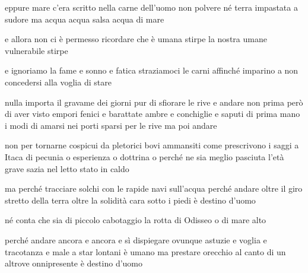 \begin{poem}
	\begin{stanza}
		eppure mare c’era scritto\verseline
		nella carne dell’uomo\verseline
		non polvere\verseline
		né terra impastata a sudore\verseline
		ma acqua\verseline
		acqua salsa\verseline
		acqua di mare
	\end{stanza}

	\begin{stanza}
		e allora non ci è permesso ricordare\verseline
		che è umana stirpe la nostra\verseline
		umane vulnerabile stirpe
	\end{stanza}

	\begin{stanza}
		e ignoriamo la fame\verseline
		e sonno e fatica\verseline
		straziamoci le carni\verseline
		affinché imparino a non concedersi\verseline
		alla voglia di stare
	\end{stanza}

	\begin{stanza}
		nulla importa il gravame dei giorni\verseline
		pur di sfiorare le rive e andare\verseline
		non prima però di aver visto\verseline
		empori fenici e barattate\verseline
		ambre e conchiglie e saputi\verseline
		di prima mano i modi\verseline
		di amarsi nei porti sparsi\verseline
		per le rive ma poi andare
	\end{stanza}

	\begin{stanza}
		non per tornarne cospicui\verseline
		da pletorici bovi ammansiti\verseline
		come prescrivono i saggi\verseline
		a Itaca di pecunia o esperienza\verseline
		o dottrina o perché ne sia\verseline
		meglio pasciuta l’età grave\verseline
		sazia nel letto stato in caldo
	\end{stanza}

	\begin{stanza}
		ma perché tracciare solchi\verseline
		con le rapide navi sull’acqua\verseline
		perché andare oltre il giro\verseline
		stretto della terra\verseline
		oltre la solidità\verseline
		cara sotto i piedi\verseline
		è destino d’uomo
	\end{stanza}

	\begin{stanza}
		né conta che sia di piccolo\verseline
		cabotaggio la rotta di Odisseo\verseline
		o di mare alto
	\end{stanza}

	\begin{stanza}
		perché andare ancora e ancora\verseline
		e sì dispiegare ovunque astuzie\verseline
		e voglia e tracotanza e male\verseline
		a star lontani è umano\verseline
		ma prestare orecchio\verseline
		al canto di un altrove\verseline
		onnipresente\verseline
		è destino d’uomo
	\end{stanza}


\end{poem}
